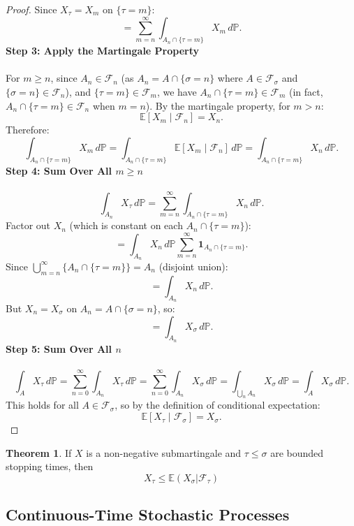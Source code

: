 \documentclass[11pt,a4paper]{article}
\theoremstyle{definition}
\newtheorem{theorem}{Theorem}[section]
\begin{document}
\begin{proof}
Since $X_\tau = X_m$ on $\{\tau = m\}$:
\[
= \sum_{m=n}^\infty \int_{A_n \cap \{\tau = m\}} X_m \, d\mathbb{P}.
\]
\noindent
\textbf{Step 3: Apply the Martingale Property}
~\\~\\ \noindent
For $m \geq n$, since $A_n \in \mathcal{F}_n$ (as $A_n = A \cap \{\sigma = n\}$ where $A \in \mathcal{F}_\sigma$ and $\{\sigma = n\} \in \mathcal{F}_n$), and $\{\tau = m\} \in \mathcal{F}_m$, we have $A_n \cap \{\tau = m\} \in \mathcal{F}_m$ (in fact, $A_n \cap \{\tau = m\} \in \mathcal{F}_n$ when $m = n$). By the martingale property, for $m > n$:
\[
\mathbb{E}[X_m \mid \mathcal{F}_n] = X_n.
\]
Therefore:
\[
\int_{A_n \cap \{\tau = m\}} X_m \, d\mathbb{P} = \int_{A_n \cap \{\tau = m\}} \mathbb{E}[X_m \mid \mathcal{F}_n] \, d\mathbb{P} = \int_{A_n \cap \{\tau = m\}} X_n \, d\mathbb{P}.
\]
\textbf{Step 4: Sum Over All $m \geq n$}
~\\~\\ \noindent
\[
\int_{A_n} X_\tau \, d\mathbb{P} = \sum_{m=n}^\infty \int_{A_n \cap \{\tau = m\}} X_n \, d\mathbb{P}.
\]
Factor out $X_n$ (which is constant on each $A_n \cap \{\tau = m\}$):
\[
= \int_{A_n} X_n \, d\mathbb{P} \sum_{m=n}^\infty \mathbf{1}_{A_n \cap \{\tau = m\}}.
\]
Since $\bigcup_{m=n}^\infty \{A_n \cap \{\tau = m\}\} = A_n$ (disjoint union):
\[
= \int_{A_n} X_n \, d\mathbb{P}.
\]
But $X_n = X_\sigma$ on $A_n = A \cap \{\sigma = n\}$, so:
\[
= \int_{A_n} X_\sigma \, d\mathbb{P}.
\]
\textbf{Step 5: Sum Over All $n$}
~\\~\\ \noindent
\[
\int_A X_\tau \, d\mathbb{P} = \sum_{n=0}^\infty \int_{A_n} X_\tau \, d\mathbb{P} = \sum_{n=0}^\infty \int_{A_n} X_\sigma \, d\mathbb{P} = \int_{\bigcup_n A_n} X_\sigma \, d\mathbb{P} = \int_A X_\sigma \, d\mathbb{P}.
\]
This holds for all $A \in \mathcal{F}_\sigma$, so by the definition of conditional expectation:
\[
\mathbb{E}[X_\tau \mid \mathcal{F}_\sigma] = X_\sigma.
\]
\end{proof}

\begin{theorem}
If $X$ is a non-negative submartingale and $\tau \le \sigma$ are bounded stopping times, then \[
X_\tau \le \mathbb{E}(X_\sigma | \mathcal{F}_\tau)
\]
\end{theorem}


\subsection{Continuous-Time Stochastic Processes}
\end{document}
